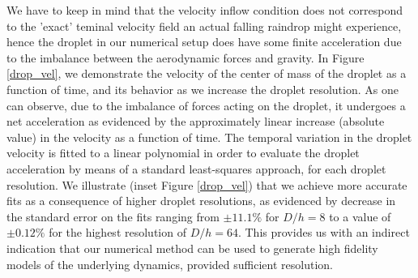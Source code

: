 We have to keep in mind that the velocity inflow condition does not correspond to the 'exact' teminal velocity field an actual falling raindrop might experience, hence the droplet in our numerical setup does have some finite acceleration due to the imbalance between the aerodynamic forces and gravity. In Figure \ref{drop_vel}, we demonstrate the velocity of the center of mass of the droplet as a function of time, and its behavior as we increase the droplet resolution. As one can observe, due to the imbalance of forces acting on the droplet, it undergoes a net acceleration as evidenced by the approximately linear increase (absolute value) in the velocity as a function of time. The temporal variation in the droplet velocity is fitted to a linear polynomial in order to evaluate the droplet acceleration by means of a standard least-squares approach, for each droplet resolution. We illustrate (inset Figure \ref{drop_vel}) that we achieve more accurate fits as a consequence of higher droplet resolutions, as evidenced by decrease in the standard error on the fits ranging from $\pm 11.1 \%$ for $D/h = 8$ to a value of $\pm 0.12 \%$ for the highest resolution of $D/h = 64$. This provides us with an indirect indication that our numerical method can be used to generate high fidelity models of the underlying dynamics, provided sufficient resolution.           


%

